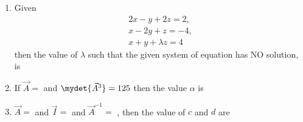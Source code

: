 \begin{enumerate}
\begin{enumerate}
    \end{enumerate}
%
\item  Given \begin{align*} 2x-y+2z=2,\\x-2y+z=-4,\\x+y+\lambda z=4 \end{align*} then the value of $\lambda$ such that the given system of equation has NO solution, is
%
        \hfill{}
        \begin{enumerate}
        \end{enumerate}
    \item If $\vec{A}=$  and $\mydet{\vec{A}^3}=125$ then the value $\alpha$ is
        \hfill{}
        \begin{enumerate}
        \end{enumerate}
%
    \item $\vec{A}=$  and $\vec{I}=$  
        and $\vec{A}^{-1} = $ , then the value of $c$ and $d$ are \hfill{}
        \begin{enumerate}

\end{enumerate}
\end{enumerate}
